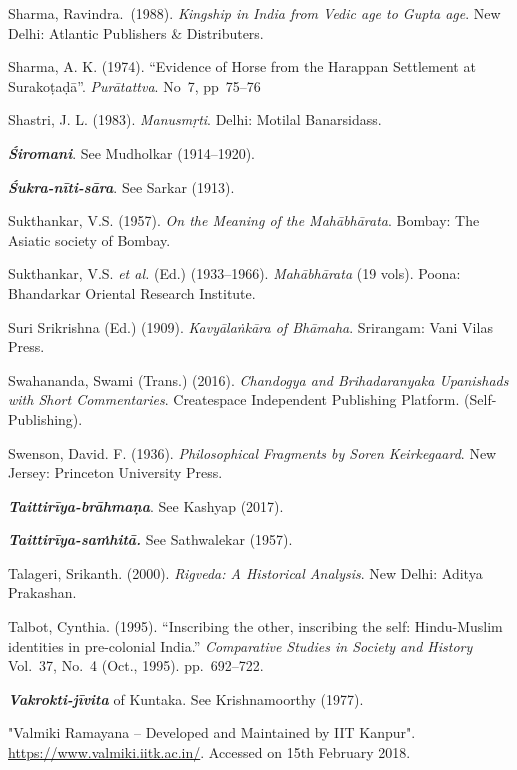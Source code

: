 \begin{thebibliography}{99}
Sharma, Ravindra.\ (1988). {\sl Kingship in India from Vedic age to Gupta age}. New Delhi: Atlantic Publishers \& Distributers. 

Sharma, A. K. (1974). “Evidence of Horse from the Harappan Settlement at Surakoṭaḍā”. {\sl Purātattva}. No~7, pp~75--76

Shastri, J. L. (1983). {\sl Manusmṛti}. Delhi: Motilal Banarsidass. 

{\sl\bfseries Śiromani}. See Mudholkar (1914--1920).

{\sl\bfseries Śukra-nīti-sāra}. See Sarkar (1913). 

Sukthankar, V.S. (1957). {\sl On the Meaning of the Mahābhārata}. Bombay: The Asiatic society of Bombay. 

Sukthankar, V.S. {\sl et al.} (Ed.) (1933--1966). {\sl Mahābhārata} (19 vols). Poona: Bhandarkar Oriental Research Institute. 

Suri Srikrishna (Ed.) (1909). {\sl Kavyālaṅkāra of Bhāmaha}. Srirangam: Vani Vilas Press. 

Swahananda, Swami (Trans.) (2016). {\sl Chandogya and Brihadaranyaka Upanishads with Short Commentaries}. Createspace Independent Publishing Platform. (Self-Publishing). 

Swenson, David. F. (1936). {\sl Philosophical Fragments by Soren Keirkegaard}. New Jersey: Princeton University Press. 

{\sl\bfseries Taittirīya-brāhmaṇa}. See Kashyap (2017).

{\sl\bfseries Taittirīya-saṁhitā.} See Sathwalekar (1957).

Talageri, Srikanth. (2000). {\sl Rigveda: A Historical Analysis}. New Delhi: Aditya Prakashan. 

Talbot, Cynthia. (1995). “Inscribing the other, inscribing the self: Hindu-Muslim identities in pre-colonial India.” {\sl Comparative Studies in Society and History} Vol.~37, No.~4 (Oct., 1995). pp.~692--722.

{\sl\bfseries Vakrokti-jīvita} of Kuntaka. See Krishnamoorthy (1977).

"Valmiki Ramayana -- Developed and Maintained by IIT Kanpur". \url{https://www.valmiki.iitk.ac.in/}. Accessed on 15th February 2018.


\end{thebibliography}

